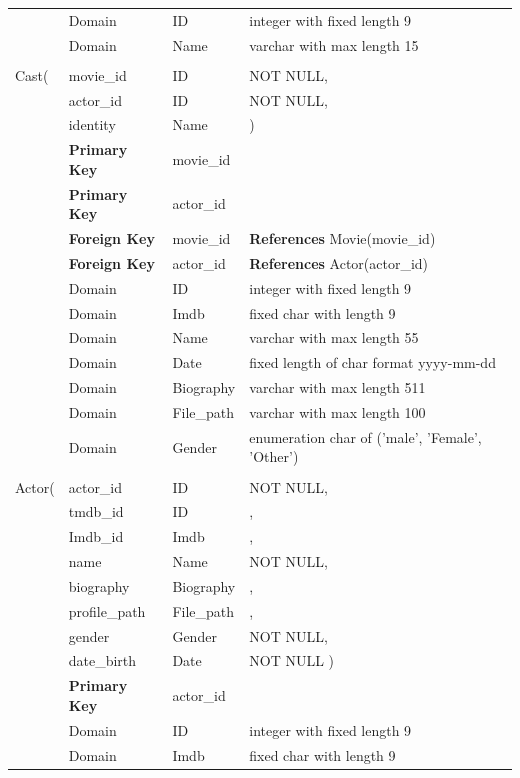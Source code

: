 \documentclass[12pt]{article}
\begin{document}
\begin{table}[H]
	\begin{tabular}{l l l l}
        \hline
        &Domain & ID & integer with fixed length 9\\
		&Domain & Name & varchar with max length 15\\
        \\Cast(
        & movie\_id & ID & NOT NULL,\\
        & actor\_id & ID & NOT NULL,\\
        & identity & Name &\hspace{4PT} )\\
        &\textbf{Primary Key}& movie\_id&\\
        &\textbf{Primary Key}& actor\_id&\\
        &\textbf{Foreign Key}& movie\_id &\textbf{References} Movie(movie\_id)\\
        &\textbf{Foreign Key}& actor\_id&\textbf{References} Actor(actor\_id)\\
        \hline
        &Domain & ID & integer with fixed length 9\\
		&Domain & Imdb & fixed char with length 9\\
		&Domain & Name & varchar with max length 55\\
		&Domain & Date  & fixed length of char format yyyy-mm-dd\\
        &Domain & Biography & varchar with max length 511\\
        &Domain & File\_path	& varchar with max length 100\\
        &Domain & Gender & enumeration char of ('male', 'Female', 'Other')\\&&&
        \\Actor(& actor\_id&ID&NOT NULL,
        \\&tmdb\_id&ID&,
        \\&Imdb\_id&Imdb&,
        \\&name&Name&NOT NULL,
        \\&biography&Biography&,
        \\&profile\_path&File\_path&,
        \\&gender&Gender&NOT NULL,
        \\&date\_birth&Date&NOT NULL
        \hspace{4PT} )\\
        &\textbf{Primary Key}& actor\_id&\\
		\hline
		&Domain & ID & integer with fixed length 9\\
		&Domain & Imdb & fixed char with length 9\\

\end{tabular}
\end{table}
\end{document}
